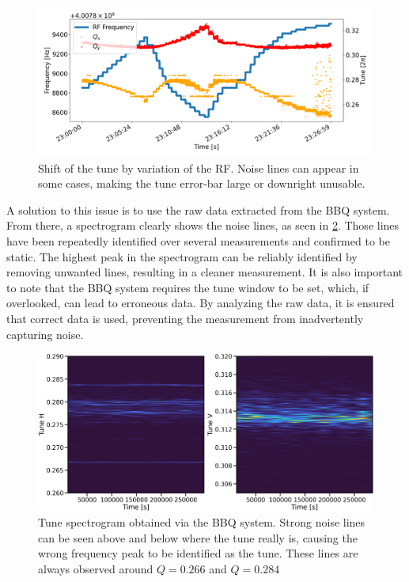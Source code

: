 \begin{figure}[!htb]
    \centering
    \includegraphics[width=\textwidth]{./images/noisy_tune.png}
    \caption{Shift of the tune by variation of the RF. Noise lines can appear in some cases,
    making the tune error-bar large or downright unusable.}
    \label{fig:decapoles:chromaticity:noisy_tune}
\end{figure}

A solution to this issue is to use the raw data extracted from the BBQ system. From there, a
spectrogram clearly shows the noise lines, as seen in \cref{fig:decapoles:chromaticity:spectrogram}.
Those lines have been repeatedly identified over several measurements and confirmed to be static.
The highest peak in the spectrogram can be reliably identified by removing unwanted lines,
resulting in a cleaner measurement. It is also important to note that the BBQ system requires the
tune window to be set, which, if overlooked, can lead to erroneous data. By analyzing the raw data,
it is ensured that correct data is used, preventing the measurement from inadvertently capturing
noise.

\begin{figure}[!htb]
    \centering
    \includegraphics[width=.8\textwidth]{./images/spectrogram.png}
    \caption{Tune spectrogram obtained via the BBQ system. Strong noise lines can be seen above and
    below where the tune really is, causing the wrong frequency peak to be identified as the tune.
    These lines are always observed around $Q = 0.266$ and $Q = 0.284$}
    \label{fig:decapoles:chromaticity:spectrogram}
\end{figure}




